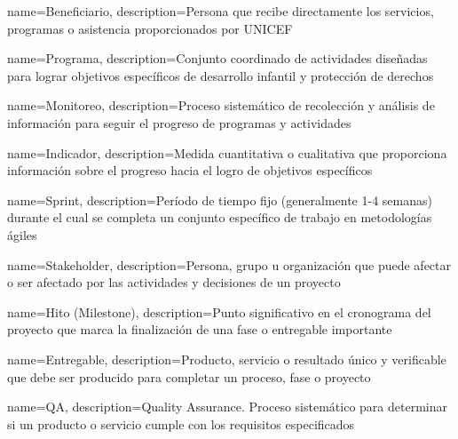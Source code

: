 
{
    name={Beneficiario},
    description={Persona que recibe directamente los servicios, programas o asistencia proporcionados por UNICEF}
}

{
    name={Programa},
    description={Conjunto coordinado de actividades diseñadas para lograr objetivos específicos de desarrollo infantil y protección de derechos}
}

{
    name={Monitoreo},
    description={Proceso sistemático de recolección y análisis de información para seguir el progreso de programas y actividades}
}

{
    name={Indicador},
    description={Medida cuantitativa o cualitativa que proporciona información sobre el progreso hacia el logro de objetivos específicos}
}


{
    name={Sprint},
    description={Período de tiempo fijo (generalmente 1-4 semanas) durante el cual se completa un conjunto específico de trabajo en metodologías ágiles}
}

{
    name={Stakeholder},
    description={Persona, grupo u organización que puede afectar o ser afectado por las actividades y decisiones de un proyecto}
}

{
    name={Hito (Milestone)},
    description={Punto significativo en el cronograma del proyecto que marca la finalización de una fase o entregable importante}
}

{
    name={Entregable},
    description={Producto, servicio o resultado único y verificable que debe ser producido para completar un proceso, fase o proyecto}
}


{
    name={QA},
    description={Quality Assurance. Proceso sistemático para determinar si un producto o servicio cumple con los requisitos especificados}
}

